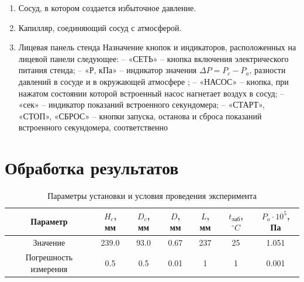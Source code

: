 \documentclass[a4paper]{article}
\begin{document}
\begin{enumerate}
    \item  Сосуд, в котором создается избыточное давление.
    \item Капилляр, соединяющий сосуд с атмосферой.
    \item Лицевая панель стенда Назначение кнопок и индикаторов, расположенных на лицевой панели следующее: – «СЕТЬ» – кнопка
включения электрического питания стенда; – «Р, кПа» – индикатор значения $\Delta P = P_c-P_a$, разности давлений в сосуде
и в окружающей атмосфере ; – «НАСОС» – кнопка, при нажатом состоянии которой встроенный насос нагнетает воздух в
сосуд; – «сек» – индикатор показаний встроенного секундомера;
– «СТАРТ», «СТОП», «СБРОС» – кнопки запуска, останова и
сброса показаний встроенного секундомера, соответственно
\end{enumerate}


\section{\textbf{Обработка результатов}}

\begin{table}[H]
    \centering
    \begin{tabular}{|c|c|c|c|c|c|c|} \hline 
         Параметр&  $H_c$, мм&  $D_c$, мм&  $D$, мм&  $L$, мм&  $t_{\text{лаб}}$, $^{\circ}C$& $P_a \cdot 10^5$, Па\\ \hline 
         Значение&  239.0&  93.0&  0.67&  237&  25& 1.051\\ \hline 
         Погрешность измерения&  0.5&  0.5&  0.01&  1&  1& 0.001\\ \hline
    \end{tabular}
    \caption{Параметры установки и условия проведения эксперимента}
\end{table}
\end{document}
